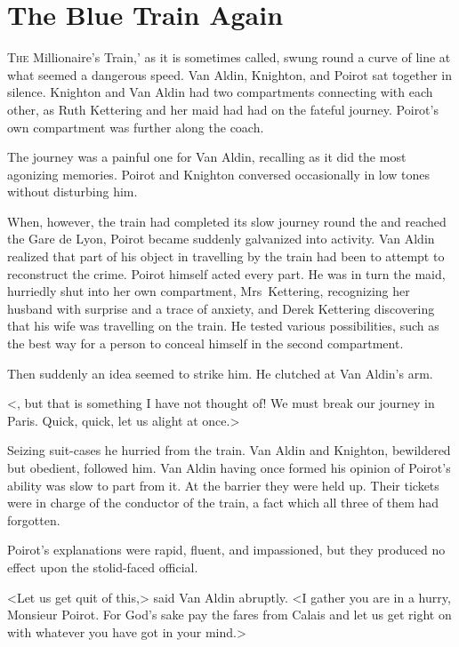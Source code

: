 \chapter{The Blue Train Again}



\lettrine[ante=`]{T}{he}  Millionaire's Train,' as it is sometimes called, swung round a curve of line at what seemed a dangerous speed. Van Aldin, Knighton, and Poirot sat together in silence. Knighton and Van Aldin had two compartments connecting with each other, as Ruth Kettering and her maid had had on the fateful journey. Poirot's own compartment was further along the coach.

The journey was a painful one for Van Aldin, recalling as it did the most agonizing memories. Poirot and Knighton conversed occasionally in low tones without disturbing him.

When, however, the train had completed its slow journey round the  and reached the Gare de Lyon, Poirot became suddenly galvanized into activity. Van Aldin realized that part of his object in travelling by the train had been to attempt to reconstruct the crime. Poirot himself acted every part. He was in turn the maid, hurriedly shut into her own compartment, Mrs~Kettering, recognizing her husband with surprise and a trace of anxiety, and Derek Kettering discovering that his wife was travelling on the train. He tested various possibilities, such as the best way for a person to conceal himself in the second compartment.

Then suddenly an idea seemed to strike him. He clutched at Van Aldin's arm.

<, but that is something I have not thought of! We must break our journey in Paris. Quick, quick, let us alight at once.>

Seizing suit-cases he hurried from the train. Van Aldin and Knighton, bewildered but obedient, followed him. Van Aldin having once formed his opinion of Poirot's ability was slow to part from it. At the barrier they were held up. Their tickets were in charge of the conductor of the train, a fact which all three of them had forgotten.

Poirot's explanations were rapid, fluent, and impassioned, but they produced no effect upon the stolid-faced official.

<Let us get quit of this,> said Van Aldin abruptly. <I gather you are in a hurry, Monsieur Poirot. For God's sake pay the fares from Calais and let us get right on with whatever you have got in your mind.>

